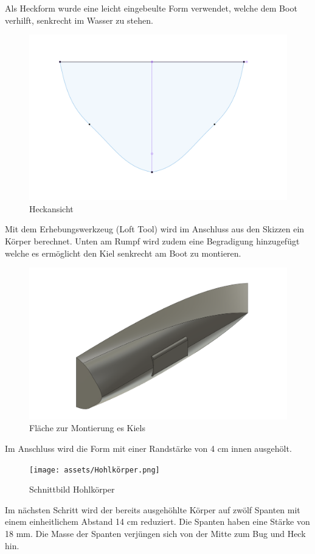 {\begin{figure}[H]
\end{figure}

Als Heckform wurde eine leicht eingebeulte Form verwendet, welche dem Boot verhilft, senkrecht im Wasser zu stehen.

\begin{figure}[H]
    \centering
    \includegraphics[width=0.6\linewidth]{assets/Heck_boot.png}
    \caption{Heckansicht}
   
\end{figure}

Mit dem Erhebungswerkzeug (Loft Tool) wird im Anschluss aus den Skizzen ein Körper berechnet. Unten am Rumpf wird zudem eine Begradigung hinzugefügt welche es ermöglicht den Kiel senkrecht am Boot zu montieren.
\begin{figure}[H]
    \centering
    \includegraphics[width=0.75\linewidth]{assets/kielbefestigung2image.png}
    \caption{Fläche zur Montierung es Kiels}
    \label{fig:enter-label}
\end{figure}

Im Anschluss wird die Form mit einer Randstärke von 4 cm innen ausgehölt. 
\begin{figure}[H]
    \centering
    \texttt{[image: assets/Hohlkörper.png]}
    \caption{Schnittbild Hohlkörper}

\end{figure}
Im nächsten Schritt wird der bereits ausgehöhlte Körper auf zwölf Spanten mit einem einheitlichem Abstand 14 cm reduziert. Die Spanten haben eine Stärke von 18 mm. Die Masse der Spanten verjüngen sich von der Mitte zum Bug und Heck hin.

}
